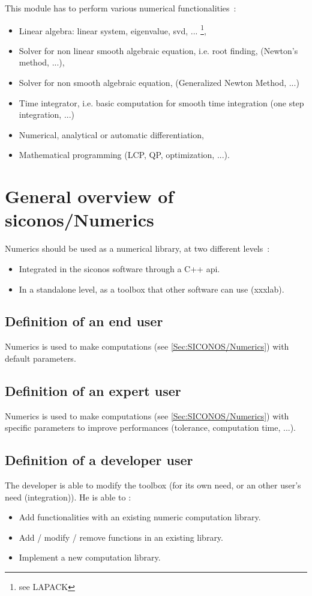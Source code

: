 This module has to perform various numerical functionalities~:
\begin{itemize}
 \item Linear algebra: linear system, eigenvalue, svd, ... \footnote{see LAPACK},
 \item Solver for non linear smooth algebraic equation, i.e. root finding, (Newton's method, ...),
 \item Solver for non smooth algebraic equation, (Generalized Newton Method, ...)
 \item Time integrator, i.e. basic computation for smooth time integration (one step integration, ...)
 \item Numerical, analytical or automatic differentiation,
 \item Mathematical programming (LCP, QP, optimization, ...).
\end{itemize}


\section{General overview of \ac{siconos}/Numerics}
Numerics should be used as a numerical library, at two different levels~:
\begin{itemize}
\item Integrated in the \ac{siconos} software through a C++ \ac{api}.
\item In a standalone level, as a toolbox that other software can use (\ac{xxxlab}).
\end{itemize}


\subsection{Definition of an end user}
\label{Sec:End-user}
Numerics is used to make computations (see \ref{Sec:SICONOS/Numerics}) with default parameters.

\subsection{Definition of an expert user}
\label{Sec:Expert-user}
Numerics is used to make computations (see \ref{Sec:SICONOS/Numerics}) with specific parameters to improve performances (tolerance, computation time, ...).


\subsection{Definition of a developer user}
\label{Sec:Developer}
The developer is able to modify the toolbox (for its own need, or an other user's need (integration)).
He is able to :
        \begin{itemize}
        \item Add functionalities with an existing numeric computation library.
        \item Add / modify / remove functions in an existing library.
        \item Implement a new computation library.
        \end{itemize}

\clearpage
